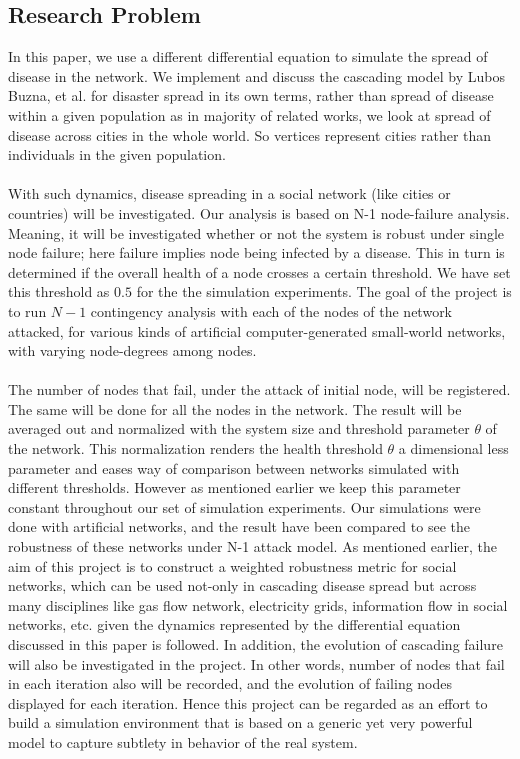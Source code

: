 \documentclass[11pt]{article}
\begin{document}
\subsection{Research Problem}
In this paper, we use a different differential equation to simulate the spread of disease in the network. We implement and discuss the cascading model by Lubos Buzna, et al. \cite{helbing} for disaster spread in its own terms, rather than spread of disease within a given population as in majority of related works, we look at spread of disease across cities in the whole world. So vertices represent cities rather than individuals in the given population.\\
\\
With such dynamics, disease spreading in a social network (like cities or countries) will be investigated.  Our analysis is based on N-1 node-failure analysis. Meaning, it will be investigated whether or not the system is robust under single node failure; here failure implies node being infected by a disease. This in turn is determined if the overall health of a node crosses a certain threshold. We have set this threshold as $0.5$ for the the simulation experiments. The goal of the project is to run $N-1$ contingency analysis with each of the nodes of the network attacked, for various kinds of artificial computer-generated small-world networks, with varying node-degrees among nodes.\\
\\
The number of nodes that fail, under the attack of initial node, will be registered. The same will be done for all the nodes in the network. The result will be averaged out and normalized with the system size and threshold parameter $\theta$ of the network. This normalization renders the health threshold $\theta$ a dimensional less parameter and eases way of comparison between networks simulated with different thresholds. However as mentioned earlier we keep this parameter constant throughout our set of simulation experiments. Our simulations were done with artificial networks, and the result have been compared to see the robustness of these networks under N-1 attack model. As mentioned earlier, the aim of this project is to construct a weighted robustness metric for social networks, which can be used not-only in cascading disease spread but across many disciplines like gas flow network, electricity grids, information flow in social networks, etc. given the dynamics represented by the differential equation discussed in this paper is followed. In addition, the evolution of cascading failure will also be investigated in the project. In other words, number of nodes that fail in each iteration also will be recorded, and the evolution of failing nodes displayed for each iteration. Hence this project can be regarded as an effort to build a simulation environment that is based on a generic yet very powerful model to capture subtlety in behavior of the real system.
\end{document}
